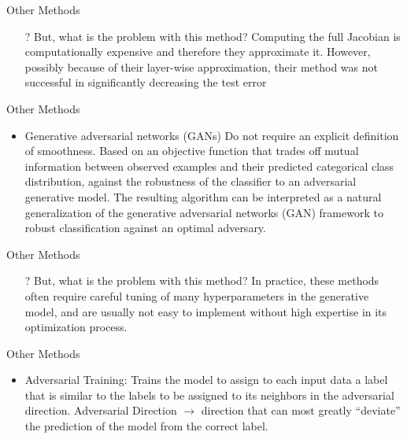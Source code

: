 \begin{frame}{Other Methods}
\begin{enumerate}
  \item[?] But, what is the problem with this method?
  \newline
  \newline
  Computing the full Jacobian is computationally expensive and therefore they approximate it.
  \newline
  However, possibly because of their layer-wise approximation, their method was not successful in significantly decreasing the test error
%
\end{enumerate}
\end{frame}

\begin{frame}{Other Methods}
\begin{itemize}
\item  Generative adversarial networks (GANs)
\newline
\newline
Do not require an explicit definition of smoothness. 
\newline
\newline
Based on an objective function that trades off mutual information between observed examples and their predicted categorical class distribution, against the robustness of the classifier to an adversarial generative model. The resulting algorithm can be interpreted as a natural generalization of the generative adversarial networks (GAN) framework to robust classification against an optimal adversary.
\end{itemize}
\end{frame}

\begin{frame}{Other Methods}
\begin{enumerate}
  \item[?] But, what is the problem with this method?
  \newline
  \newline
In practice, these methods often require
careful tuning of many hyperparameters in the generative
model, and are usually not easy to implement without high
expertise in its optimization process.
\end{enumerate}
\end{frame}


\begin{frame}{Other Methods}
\begin{itemize}
  \item Adversarial Training:
  \newline 
  \newline
  Trains the model to assign to each input data a label that is similar to the labels to be assigned to its neighbors in the adversarial direction.
  \newline 
  Adversarial Direction $\rightarrow$ direction that can most greatly “deviate” the prediction of the model from the correct label.
\end{itemize}
\end{frame}

